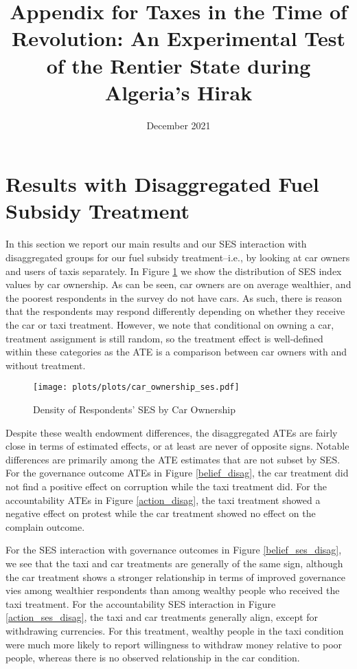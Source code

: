 \documentclass[12pt, letterpaper]{article}
\title{Appendix for Taxes in the Time of Revolution: An Experimental Test of the Rentier State during Algeria's Hirak}
\date{December 2021}
\begin{document}
\maketitle

\tableofcontents

\section{Results with Disaggregated Fuel Subsidy Treatment}

In this section we report our main results and our SES interaction with disaggregated groups for our fuel subsidy treatment--i.e., by looking at car owners and users of taxis separately. In Figure \ref{fig:car} we show the distribution of SES index values by car ownership. As can be seen, car owners are on average wealthier, and the poorest respondents in the survey do not have cars. As such, there is reason that the respondents may respond differently depending on whether they receive the car or taxi treatment. However, we note that conditional on owning a car, treatment assignment is still random, so the treatment effect is well-defined within these categories as the ATE is a comparison between car owners with and without treatment.


\begin{figure}
    \centering
    \caption{Density of Respondents' SES by Car Ownership}
    \texttt{[image: plots/plots/car\_ownership\_ses.pdf]}
    
    \label{fig:car}
\end{figure}


Despite these wealth endowment differences, the disaggregated ATEs  are fairly close in terms of estimated effects, or at least are never of opposite signs. Notable differences are primarily among the ATE estimates that are not subset by SES. For the governance outcome ATEs in Figure \ref{belief_disag}, the car treatment did not find a positive effect on corruption while the taxi treatment did. For the accountability ATEs in Figure \ref{action_disag}, the taxi treatment showed a negative effect on protest while the car treatment showed no effect on the complain outcome. 

For the SES interaction with governance outcomes in Figure \ref{belief_ses_disag}, we see that the taxi and car treatments are generally of the same sign, although the car treatment shows a stronger relationship in terms of improved governance vies among wealthier respondents than among wealthy people who received the taxi treatment. For the accountability SES interaction in Figure \ref{action_ses_disag}, the taxi and car treatments generally align, except for withdrawing currencies. For this treatment, wealthy people in the taxi condition were much more likely to report willingness to withdraw money relative to poor people, whereas there is no observed relationship in the car condition.
\end{document}
